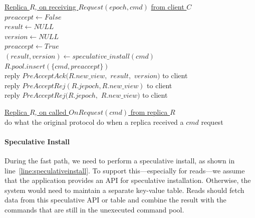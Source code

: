 \documentclass[twocolumn]{article}
\begin{document}
\begin{algorithm}
\caption{JetPack - Prepare}
    \label{alg:jetpack_prepare}
    \setcounter{AlgoLine}{16}
    
    \underline{Replica $R$, on receiving $Request(epoch, cmd)$}
    \underline{from client $C$}\\
     {
        $preaccept\gets False$\\
        $result\gets NULL$\\
        $version\gets NULL$\\
         {
            $preaccept\gets True$\\
             {
                $(result, version)\gets  speculative\_install(cmd)$\label{line:speculativeinstall}\\
            }
        }
        $R.pool.insert(\{cmd, preaccept\})$\label{line:commandpoolinsert}\\
         {
            reply $PreAcceptAck(R.new\_view,$ $result,$ $version)$ to client\\
        } {
            reply $PreAcceptRej(R.jepoch, R.new\_view)$ to client\\
        }
    } {
        reply $PreAcceptRej(R.jepoch,$ $R.new\_view)$ to client\\
    }

    \vskip 10pt
    \underline{Replica $R$, on called $OnRequest(cmd)$ from }
    \underline{replica $R$}\\
    do what the original protocol do when a replica received a $cmd$ request
\end{algorithm}

\paragraph{Speculative Install} 
During the fast path, we need to perform a speculative install, as shown in line~\ref{line:speculativeinstall}. To support this—especially for reads—we assume that the application provides an API for speculative installation. Otherwise, the system would need to maintain a separate key-value table. Reads should fetch data from this speculative API or table and combine the result with the commands that are still in the unexecuted command pool.
\end{document}
